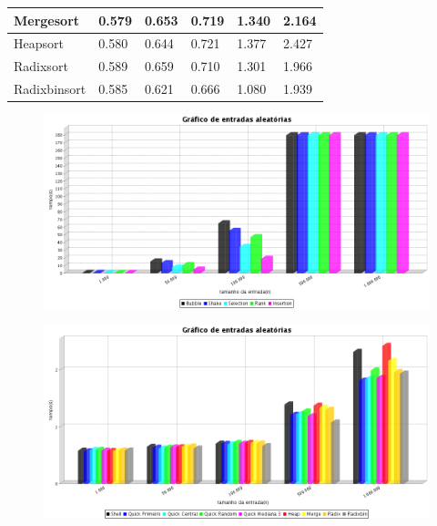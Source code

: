 \documentclass{article}
\begin{document}
\begin{flushleft}
\begin{itemize}
\begin{table}[ht]
\begin{tabular}{l|lllll|}
\multicolumn{1}{|l|}{Mergesort}          & 0.579          & 0.653           & 0.719            & 1.340            & 2.164              \\ \hline
\multicolumn{1}{|l|}{Heapsort}           & 0.580          & 0.644           & 0.721            & 1.377            & 2.427              \\ \hline
\multicolumn{1}{|l|}{Radixsort}          & 0.589          & 0.659           & 0.710            & 1.301            & 1.966              \\ \hline
\multicolumn{1}{|l|}{Radixbinsort}       & 0.585          & 0.621           & 0.666            & 1.080            & 1.939              \\ \hline
\end{tabular}
\end{table}

\begin{figure}[!htb]	
   	\includegraphics[width=16cm]{grafico5.png}
\end{figure} 
\newpage

\begin{figure}[!htb]	
   	\includegraphics[width=16cm]{grafico6.png}
\end{figure} 


\end{itemize}
\end{flushleft}
\end{document}
